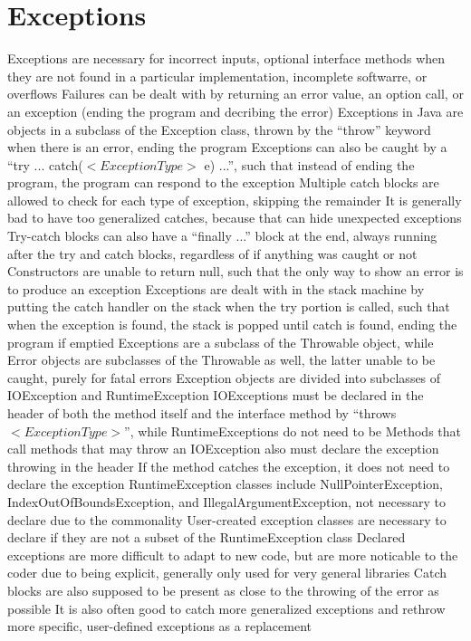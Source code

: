 \documentclass[11 pt, twoside]{article}
\newenvironment{outline*}
{
	\begin{outline}[enumerate]
	}
	{\end{outline}
}
\begin{document}
\section{Exceptions}
\begin{outline*}
\1 Exceptions are necessary for incorrect inputs, optional interface methods when they are not found in a particular implementation, incomplete softwarre, or overflows
	\2 Failures can be dealt with by returning an error value, an option call, or an exception (ending the program and decribing the error)
	\2 Exceptions in Java are objects in a subclass of the Exception class, thrown by the ``throw'' keyword when there is an error, ending the program
		\3 Exceptions can also be caught by a ``try {...} catch($<ExceptionType>$ e) {...}'', such that instead of ending the program, the program can respond to the exception
			\4 Multiple catch blocks are allowed to check for each type of exception, skipping the remainder
			\4 It is generally bad to have too generalized catches, because that can hide unexpected exceptions
			\4 Try-catch blocks can also have a ``finally {...}'' block at the end, always running after the try and catch blocks, regardless of if anything was caught or not
		\3 Constructors are unable to return null, such that the only way to show an error is to produce an exception
		\3 Exceptions are dealt with in the stack machine by putting the catch handler on the stack when the try portion is called, such that when the exception is found, the stack is popped until catch is found, ending the program if emptied
\1 Exceptions are a subclass of the Throwable object, while Error objects are subclasses of the Throwable as well, the latter unable to be caught, purely for fatal errors
	\2 Exception objects are divided into subclasses of IOException and RuntimeException
		\3 IOExceptions must be declared in the header of both the method itself and the interface method by ``throws $<ExceptionType>$'', while RuntimeExceptions do not need to be
		\3 Methods that call methods that may throw an IOException also must declare the exception throwing in the header
		\3 If the method catches the exception, it does not need to declare the exception
	\2 RuntimeException classes include NullPointerException, IndexOutOfBoundsException, and IllegalArgumentException, not necessary to declare due to the commonality
	\2 User-created exception classes are necessary to declare if they are not a subset of the RuntimeException class
\1 Declared exceptions are more difficult to adapt to new code, but are more noticable to the coder due to being explicit, generally only used for very general libraries
	\2 Catch blocks are also supposed to be present as close to the throwing of the error as possible
	\2 It is also often good to catch more generalized exceptions and rethrow more specific, user-defined exceptions as a replacement
\end{outline*}
\end{document}
